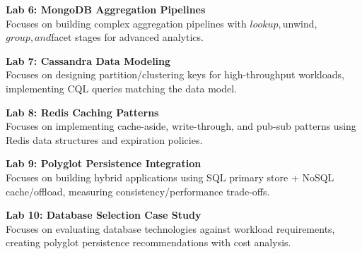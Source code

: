 \noindent\textbf{Lab 6: MongoDB Aggregation Pipelines} \\
Focuses on building complex aggregation pipelines with $lookup, $unwind, $group, and $facet stages for advanced analytics.

\vspace{0.2cm}

\noindent\textbf{Lab 7: Cassandra Data Modeling} \\
Focuses on designing partition/clustering keys for high-throughput workloads, implementing CQL queries matching the data model.

\vspace{0.2cm}

\noindent\textbf{Lab 8: Redis Caching Patterns} \\
Focuses on implementing cache-aside, write-through, and pub-sub patterns using Redis data structures and expiration policies.

\vspace{0.2cm}

\noindent\textbf{Lab 9: Polyglot Persistence Integration} \\
Focuses on building hybrid applications using SQL primary store + NoSQL cache/offload, measuring consistency/performance trade-offs.

\vspace{0.2cm}

\noindent\textbf{Lab 10: Database Selection Case Study} \\
Focuses on evaluating database technologies against workload requirements, creating polyglot persistence recommendations with cost analysis.

\vspace{0.2cm}

\newpage
{}
